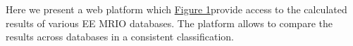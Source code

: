 Here we present a web platform which \href{Fig 1}{Figure 1}provide access to the calculated results of
various EE MRIO databases. The platform allows to compare the results across
databases in a consistent classification. 